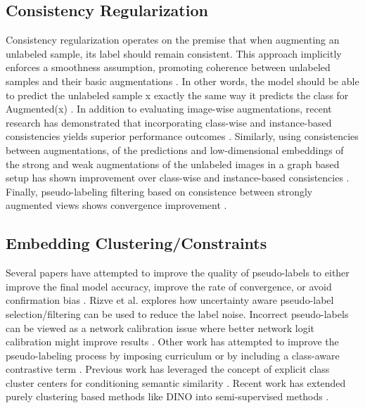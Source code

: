 \documentclass[10pt,twocolumn,letterpaper]{article}
\begin{document}
\subsection{Consistency Regularization}

Consistency regularization operates on the premise that when augmenting an unlabeled sample, its label should remain consistent. 
This approach implicitly enforces a smoothness assumption, promoting coherence between unlabeled samples and their basic augmentations \cite{xie2020unsupervised}. 
In other words, the model should be able to predict the unlabeled sample x exactly the same way it predicts the class for Augmented(x) \cite{berthelot2019mixmatch,sohn2020fixmatch,berthelot2019remixmatch,mustafa2020transformation}. 
In addition to evaluating image-wise augmentations, recent research has demonstrated that incorporating class-wise and instance-based consistencies yields superior performance outcomes \cite{zheng2022simmatch,li2021comatch}. 
Similarly, using consistencies between augmentations, of the predictions and low-dimensional embeddings of the strong and weak augmentations of the unlabeled images in a graph based setup has shown improvement over class-wise and instance-based consistencies \cite{zheng2023simmatchv2}.
Finally, pseudo-labeling filtering based on consistence between strongly augmented views shows convergence improvement \cite{kim2022conmatch}.

\subsection{Embedding Clustering/Constraints}


Several papers have attempted to improve the quality of pseudo-labels to either improve the final model accuracy, improve the rate of convergence, or avoid confirmation bias \cite{arazo2020pseudo}.
Rizve et al. \cite{rizve2021defense} explores how uncertainty aware pseudo-label selection/filtering can be used to reduce the label noise.
Incorrect pseudo-labels can be viewed as a network calibration issue \cite{rizve2021defense} where better network logit calibration might improve results \cite{Xing2020DistanceBased}.
Other work has attempted to improve the pseudo-labeling process by imposing curriculum \cite{zhang2021flexmatch} or by including a class-aware contrastive term \cite{yang2022class}.
Previous work has leveraged the concept of explicit class cluster centers for conditioning semantic similarity \cite{zheng2022simmatch}.
Recent work has extended purely clustering based methods like DINO \cite{caron2021emerging} into semi-supervised methods \cite{fini2023semi}.
\end{document}
